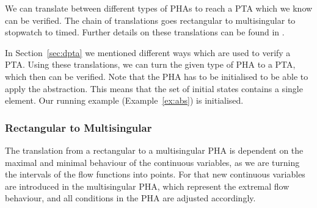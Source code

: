\label{sec:phatrans}
We can translate between different types of PHAs to reach a PTA which we know can be verified.
The chain of translations goes rectangular to multisingular to stopwatch to timed. Further details on these translations can be found in \cite{Sproston2001}.

In Section~\ref{sec:dpta} we mentioned different ways which are used to verify a PTA.
Using these translations, we can turn the given type of PHA to a PTA, which then can be verified. Note that the PHA has to be initialised to be able to apply the abstraction. This means that the set of initial states contains a single element. Our running example (Example~\ref{ex:abs}) is initialised.

\subsubsection{Rectangular to Multisingular}
The translation from a rectangular to a multisingular PHA is dependent on the maximal and minimal behaviour of the continuous variables, as we are turning the intervals of the flow functions into points. For that new continuous variables are introduced in the multisingular PHA, which represent the extremal flow behaviour, and all conditions in the PHA are adjusted accordingly.

